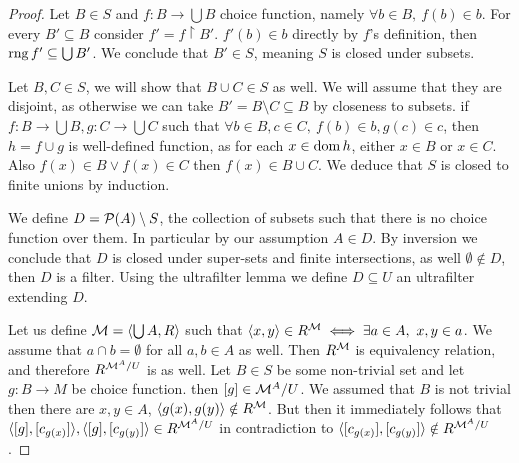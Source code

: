 \begin{proof}
	Let $B \in S$ and $f : B \to \bigcup B$ choice function, namely $\forall b \in B,\ f(b) \in b$.
	For every $B' \subseteq B$ consider $f' = f \restriction B'$.
	$f'(b) \in b$ directly by $f$'s definition, then $\operatorname{rng} f' \subseteq \bigcup B'$.
	We conclude that $B' \in S$, meaning $S$ is closed under subsets.

	Let $B, C \in S$, we will show that $B \cup C \in S$ as well.
	We will assume that they are disjoint, as otherwise we can take $B' = B \setminus C \subseteq B$ by closeness to subsets.
	if $f : B \to \bigcup B, g : C \to \bigcup C$ such that $\forall b \in B, c \in C,\ f(b) \in b, g(c) \in c$, then $h = f \cup g$ is well-defined function,
	as for each $x \in \operatorname{dom} h$, either $x \in B$ or $x \in C$.
	Also $f(x) \in B \lor f(x) \in C$ then $f(x) \in B \cup C$.
	We deduce that $S$ is closed to finite unions by induction.

	We define $D = \mathcal{P}(A) \setminus S$, the collection of subsets such that there is no choice function over them. In particular by our assumption $A \in D$.
	By inversion we conclude that $D$ is closed under super-sets and finite intersections, as well $\emptyset \notin D$, then $D$ is a filter.
	Using the ultrafilter lemma we define $D \subseteq U$ an ultrafilter extending $D$.

	Let us define $\mathcal{M} = \langle \bigcup A, R \rangle$ such that $\langle x, y \rangle \in R^{\mathcal{M}} \iff \exists a \in A,\ x, y \in a$.
	We assume that $a \cap b = \emptyset$ for all $a, b \in A$ as well.
	Then $R^{\mathcal{M}}$ is equivalency relation, and therefore $R^{\mathcal{M}^A / U}$ is as well.
	Let $B \in S$ be some non-trivial set and let $g : B \to M$ be choice function.
	then $[g] \in \mathcal{M}^A / U$.
	We assumed that $B$ is not trivial then there are $x, y \in A$, $\langle g(x), g(y) \rangle \notin R^{\mathcal{M}}$.
	But then it immediately follows that $\langle [g], [c_{g(x)}] \rangle, \langle [g], [c_{g(y)}] \rangle \in R^{\mathcal{M}^A / U}$ in contradiction to $\langle [c_{g(x)}], [c_{g(y)}] \rangle \notin R^{\mathcal{M}^A / U}$.
\end{proof}

